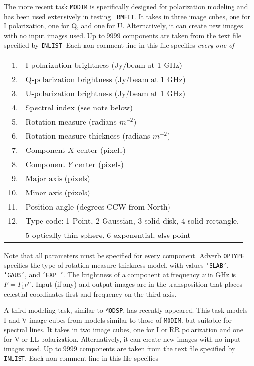 \documentclass[twoside]{article}
\begin{document}
The more recent task {\tt MODIM} is specifically designed for
polarization modeling and has been used extensively in testing {\tt
  RMFIT}\@.  It takes in three image cubes, one for I polarization,
one for Q, and one for U.  Alternatively, it can create new images
with no input images used.  Up to 9999 components are taken from the
text file specified by {\tt INLIST}\@.  Each non-comment line in this
file specifies {\it every one of}
\begin{center}
\begin{tabular}{|r|l|}\hline
 1. & I-polarization brightness (Jy/beam at 1 GHz)\\
 2. & Q-polarization brightness (Jy/beam at 1 GHz)\\
 3. & U-polarization brightness (Jy/beam at 1 GHz)\\
 4. & Spectral index (see note below)\\
 5. & Rotation measure (radians $m^{-2}$)\\
 6. & Rotation measure thickness (radians $m^{-2}$)\\
 7. & Component $X$ center (pixels)\\
 8. & Component $Y$ center (pixels)\\
 9. & Major axis (pixels)\\
10. & Minor axis (pixels)\\
11. & Position angle (degrees CCW from North)\\
12. & Type code: 1 Point, 2 Gaussian, 3 solid disk, 4 solid rectangle,\\
    & 5 optically thin sphere, 6 exponential, else point\\ \hline
\end{tabular}
\end{center}
Note that all parameters must be specified for every component.
Adverb {\tt OPTYPE} specifies the type of rotation measure thickness
model, with values {\tt 'SLAB'}, {\tt 'GAUS'}, and {\tt 'EXP '}\@.
The brightness of a component at frequency $\nu$ in GHz is $F = F_1
\nu^\alpha$\@.  Input (if any) and output images are in the
transposition that places celestial coordinates first and frequency on
the third axis.

A third modeling task, similar to {\tt MODSP}, has recently appeared.
This task models I and V image cubes from models similar to those of
{\tt MODIM}, but suitable for spectral lines.  It takes in two image
cubes, one for I or RR polarization and one for V or LL polarization.
Alternatively, it can create new images with no input images used.  Up
to 9999 components are taken from the text file specified by {\tt
  INLIST}\@.  Each non-comment line in this file specifies
\end{document}
